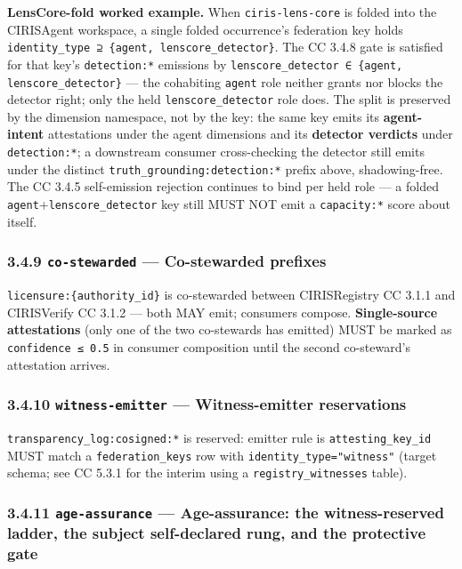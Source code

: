 \documentclass[11pt]{article}
\begin{document}
\textbf{LensCore-fold worked example.} When \texttt{ciris-lens-core} is folded into the CIRISAgent workspace, a single folded occurrence's federation key holds \texttt{identity\_type ⊇ \{agent, lenscore\_detector\}}. The CC 3.4.8 gate is satisfied for that key's \texttt{detection:*} emissions by \texttt{lenscore\_detector ∈ \{agent, lenscore\_detector\}} — the cohabiting \texttt{agent} role neither grants nor blocks the detector right; only the held \texttt{lenscore\_detector} role does. The split is preserved by the dimension namespace, not by the key: the same key emits its \textbf{agent-intent} attestations under the agent dimensions and its \textbf{detector verdicts} under \texttt{detection:*}; a downstream consumer cross-checking the detector still emits under the distinct \texttt{truth\_grounding:detection:*} prefix above, shadowing-free. The CC 3.4.5 self-emission rejection continues to bind per held role — a folded \texttt{agent}+\texttt{lenscore\_detector} key still MUST NOT emit a \texttt{capacity:*} score about itself.


\subsubsection*{3.4.9 \texttt{co-stewarded} — Co-stewarded prefixes}


\texttt{licensure:\{authority\_id\}} is co-stewarded between CIRISRegistry CC 3.1.1 and CIRISVerify CC 3.1.2 — both MAY emit; consumers compose. \textbf{Single-source attestations} (only one of the two co-stewards has emitted) MUST be marked as \texttt{confidence ≤ 0.5} in consumer composition until the second co-steward's attestation arrives.


\subsubsection*{3.4.10 \texttt{witness-emitter} — Witness-emitter reservations}


\texttt{transparency\_log:cosigned:*} is reserved: emitter rule is \texttt{attesting\_key\_id} MUST match a \texttt{federation\_keys} row with \texttt{identity\_type="witness"} (target schema; see CC 5.3.1 for the interim using a \texttt{registry\_witnesses} table).


\subsubsection*{3.4.11 \texttt{age-assurance} — Age-assurance: the witness-reserved ladder, the subject self-declared rung, and the protective gate}
\end{document}
